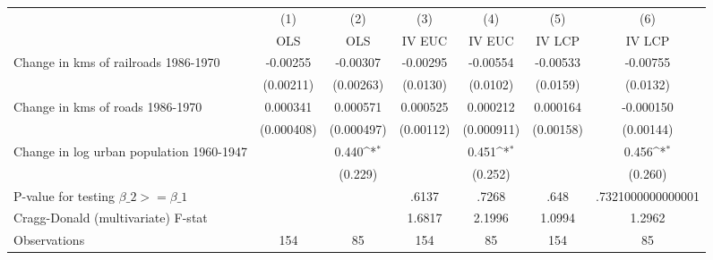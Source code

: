 {
\def\sym#1{\ifmmode^{#1}\else\(^{#1}\)\fi}
\begin{tabular}{l*{6}{c}}
\hline\hline
                &\multicolumn{1}{c}{(1)}&\multicolumn{1}{c}{(2)}&\multicolumn{1}{c}{(3)}&\multicolumn{1}{c}{(4)}&\multicolumn{1}{c}{(5)}&\multicolumn{1}{c}{(6)}\\
                &\multicolumn{1}{c}{OLS}&\multicolumn{1}{c}{OLS}&\multicolumn{1}{c}{IV EUC}&\multicolumn{1}{c}{IV EUC}&\multicolumn{1}{c}{IV LCP}&\multicolumn{1}{c}{IV LCP}\\
\hline
Change in kms of railroads 1986-1970& -0.00255         & -0.00307         & -0.00295         & -0.00554         & -0.00533         & -0.00755         \\
                &(0.00211)         &(0.00263)         & (0.0130)         & (0.0102)         & (0.0159)         & (0.0132)         \\
[1em]
Change in kms of roads 1986-1970& 0.000341         & 0.000571         & 0.000525         & 0.000212         & 0.000164         &-0.000150         \\
                &(0.000408)         &(0.000497)         &(0.00112)         &(0.000911)         &(0.00158)         &(0.00144)         \\
[1em]
Change in log urban population 1960-1947&                  &    0.440\sym{*}  &                  &    0.451\sym{*}  &                  &    0.456\sym{*}  \\
                &                  &  (0.229)         &                  &  (0.252)         &                  &  (0.260)         \\
\hline
P-value for testing $\beta\_{2} >= \beta\_{1}$&                  &                  &    .6137         &    .7268         &     .648         &.7321000000000001         \\
Cragg-Donald (multivariate) F-stat&                  &                  &   1.6817         &   2.1996         &   1.0994         &   1.2962         \\
Observations    &      154         &       85         &      154         &       85         &      154         &       85         \\
\hline\hline
\end{tabular}
}
